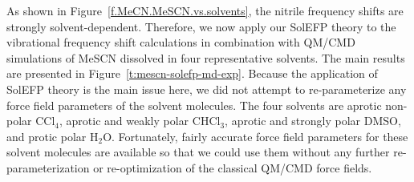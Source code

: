 \documentclass[a4paper,titlepage,twoside,fleqn,12pt]{book}
\begin{document}
\begin{refsection}
As shown in Figure~\ref{f.MeCN.MeSCN.vs.solvents}, 
the nitrile frequency shifts are strongly
solvent\hyp{}dependent. Therefore, we now apply our SolEFP
theory to the vibrational frequency shift calculations in
combination with QM/CMD simulations of MeSCN dissolved in four
representative solvents. The main results are presented in
Figure~\ref{t:mescn-solefp-md-exp}. Because the application of SolEFP theory is the main
issue here, we did not attempt to re\hyp{}parameterize any force
field parameters of the solvent molecules. The four solvents
are aprotic non\hyp{}polar CCl$_4$, aprotic and weakly polar CHCl$_3$,
aprotic and strongly polar DMSO, and protic polar H$_2$O.
Fortunately, fairly accurate force field parameters for these
solvent molecules are available so that we could use them
without any further re\hyp{}parameterization or re\hyp{}optimization of
the classical QM/CMD force fields.


\end{refsection}
\end{document}
